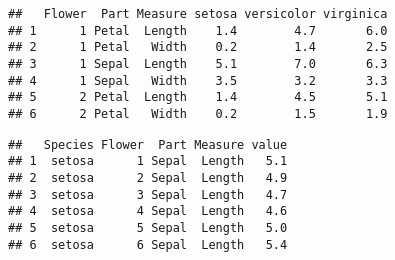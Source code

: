 \documentclass[]{article}
\newenvironment{Shaded}{\begin{snugshade}}{\end{snugshade}}
\newcommand{\CharTok}[1]{\textcolor[rgb]{0.31,0.60,0.02}{#1}}
\newcommand{\DataTypeTok}[1]{\textcolor[rgb]{0.13,0.29,0.53}{#1}}
\newcommand{\KeywordTok}[1]{\textcolor[rgb]{0.13,0.29,0.53}{\textbf{#1}}}
\newcommand{\NormalTok}[1]{#1}
\newcommand{\OperatorTok}[1]{\textcolor[rgb]{0.81,0.36,0.00}{\textbf{#1}}}
\newcommand{\StringTok}[1]{\textcolor[rgb]{0.31,0.60,0.02}{#1}}
\begin{document}
\begin{verbatim}
##   Flower  Part Measure setosa versicolor virginica
## 1      1 Petal  Length    1.4        4.7       6.0
## 2      1 Petal   Width    0.2        1.4       2.5
## 3      1 Sepal  Length    5.1        7.0       6.3
## 4      1 Sepal   Width    3.5        3.2       3.3
## 5      2 Petal  Length    1.4        4.5       5.1
## 6      2 Petal   Width    0.2        1.5       1.9
\end{verbatim}

\begin{Shaded}
\end{Shaded}

\begin{verbatim}
##   Species Flower  Part Measure value
## 1  setosa      1 Sepal  Length   5.1
## 2  setosa      2 Sepal  Length   4.9
## 3  setosa      3 Sepal  Length   4.7
## 4  setosa      4 Sepal  Length   4.6
## 5  setosa      5 Sepal  Length   5.0
## 6  setosa      6 Sepal  Length   5.4
\end{verbatim}

\begin{Shaded}
\end{Shaded}
\end{document}
